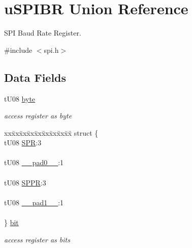 \hypertarget{unionu_s_p_i_b_r}{}\section{u\+S\+P\+I\+B\+R Union Reference}
\label{unionu_s_p_i_b_r}


S\+P\+I Baud Rate Register.  




{\ttfamily \#include $<$spi.\+h$>$}

\subsection*{Data Fields}
\begin{DoxyCompactItemize}
\item 
\hypertarget{unionu_s_p_i_b_r_aba308d63db050aed25cfd36c37e41ad4}{}t\+U08 \hyperlink{unionu_s_p_i_b_r_aba308d63db050aed25cfd36c37e41ad4}{byte}\label{unionu_s_p_i_b_r_aba308d63db050aed25cfd36c37e41ad4}

\begin{DoxyCompactList}\small\item\em access register as byte \end{DoxyCompactList}\item 
\hypertarget{unionu_s_p_i_b_r_aac10a5a0de0c040c123ea4d5ee101fab}{}\begin{tabbing}
xx\=xx\=xx\=xx\=xx\=xx\=xx\=xx\=xx\=\kill
struct \{\\
\>tU08 \hyperlink{unionu_s_p_i_b_r_a90ce353bba1df4607f61cf020126e91a}{SPR}:3\\
\>\\
\>tU08 \hyperlink{unionu_s_p_i_b_r_aa3e5250d311ceb1525f9adf38f0d7982}{\_\_pad0\_\_}:1\\
\>\\
\>tU08 \hyperlink{unionu_s_p_i_b_r_a8bae7cd20aa78f16938b90ada11a23dc}{SPPR}:3\\
\>\\
\>tU08 \hyperlink{unionu_s_p_i_b_r_a79a5f05caf4105fead38063726e0f288}{\_\_pad1\_\_}:1\\
\>\\
\} \hyperlink{unionu_s_p_i_b_r_aac10a5a0de0c040c123ea4d5ee101fab}{bit}\label{unionu_s_p_i_b_r_aac10a5a0de0c040c123ea4d5ee101fab}
\\

\end{tabbing}\begin{DoxyCompactList}\small\item\em access register as bits \end{DoxyCompactList}\end{DoxyCompactItemize}


